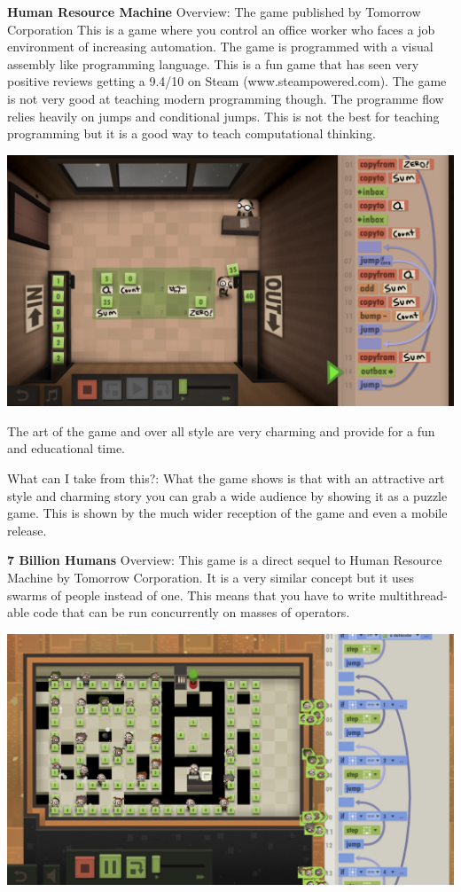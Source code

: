 \documentclass[12pt]{article}
\begin{document}
\textbf{Human Resource Machine}\newline
Overview:\newline
The game published by Tomorrow Corporation
This is a game where you control an office worker who faces a job environment of increasing automation. The game is programmed with a visual assembly like programming language. This is a fun game that has seen very positive reviews getting a 9.4/10 on Steam (www.steampowered.com). The game is not very good at teaching modern programming though. The programme flow relies heavily on jumps and conditional jumps. This is not the best for teaching programming but it is a good way to teach computational thinking.

{\centering
\includegraphics[width=15cm]{Images/HumanResourceMachine.jpg}\par
}

The art of the game and over all style are very charming and provide for a fun and educational time.

What can I take from this?:\newline
What the game shows is that with an attractive art style and charming story you can grab a wide audience by showing it as a puzzle game. This is shown by the much wider reception of the game and even a mobile release.

\textbf{7 Billion Humans}\newline
Overview:\newline
This game is a direct sequel to Human Resource Machine by Tomorrow Corporation. It is a very similar concept but it uses swarms of people instead of one. This means that you have to write multithread-able code that can be run concurrently on masses of operators.

{\centering
\includegraphics[width=15cm]{Images/7Billion.jpg}\par
}
\end{document}
